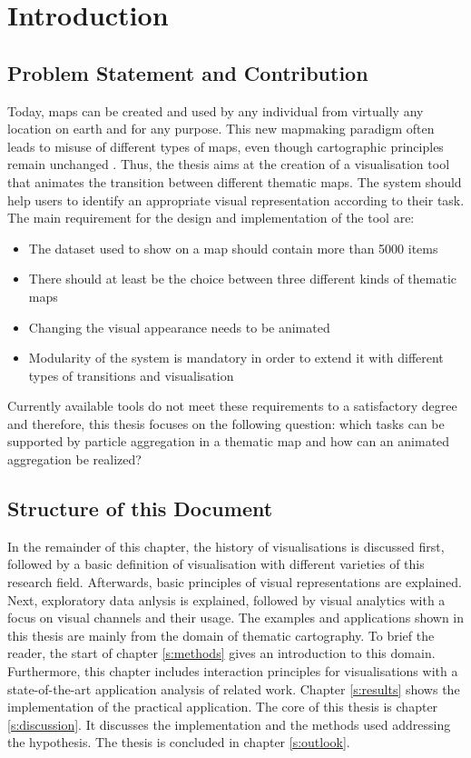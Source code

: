 \section{Introduction}


\subsection{Problem Statement and Contribution}
Today, maps can be created and used by any individual from virtually any location on earth and for any purpose. This new mapmaking paradigm often leads to misuse of different types of maps, even though cartographic principles remain unchanged .
Thus, the thesis aims at the creation of a visualisation tool that animates the transition between different thematic maps. The system should help users to identify an appropriate visual representation according to their task. The main requirement for the design and implementation of the tool are:
\begin{itemize}
\item The dataset used to show on a map should contain more than 5000 items
\item There should at least be the choice between three different kinds of thematic maps
\item Changing the visual appearance needs to be animated
\item Modularity of the system is mandatory in order to extend it with different types of transitions and visualisation
\end{itemize}
Currently available tools do not meet these requirements to a satisfactory degree and therefore, this thesis focuses on the following question:
which tasks can be supported by particle aggregation in a thematic map and how can an animated aggregation be realized?

\subsection{Structure of this Document}
In the remainder of this chapter, the history of visualisations is discussed first, followed by a basic definition of visualisation with different varieties of this research field. Afterwards, basic principles of visual representations are explained. Next, exploratory data anlysis is explained, followed by visual analytics with a focus on visual channels and their usage.
The examples and applications shown in this thesis are mainly from the domain of thematic cartography. To brief the reader, the start of chapter \ref{s:methods} gives an introduction to this domain. Furthermore, this chapter includes interaction principles for visualisations with a state-of-the-art application analysis of related work. Chapter \ref{s:results} shows the implementation of the practical application. The core of this thesis is chapter \ref{s:discussion}. It discusses the implementation and the methods used addressing the hypothesis. The thesis is concluded in chapter \ref{s:outlook}.

